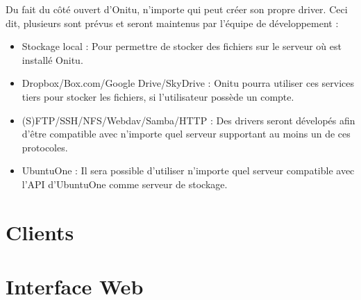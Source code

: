 Du fait du côté ouvert d'Onitu, n'importe qui peut créer son propre driver. Ceci dit, plusieurs sont prévus et seront maintenus par l'équipe de développement :
\begin{itemize}
    \item Stockage local : Pour permettre de stocker des fichiers sur le serveur où est installé Onitu.
    \item Dropbox/Box.com/Google Drive/SkyDrive : Onitu pourra utiliser ces services tiers pour stocker les fichiers, si l'utilisateur possède un compte.
    \item (S)FTP/SSH/NFS/Webdav/Samba/HTTP : Des drivers seront dévelopés afin d'être compatible avec n'importe quel serveur supportant au moins un de ces protocoles.
    \item UbuntuOne : Il sera possible d'utiliser n'importe quel serveur compatible avec l'API d'UbuntuOne comme serveur de stockage.
\end{itemize}

\section{Clients}

\section{Interface Web}
